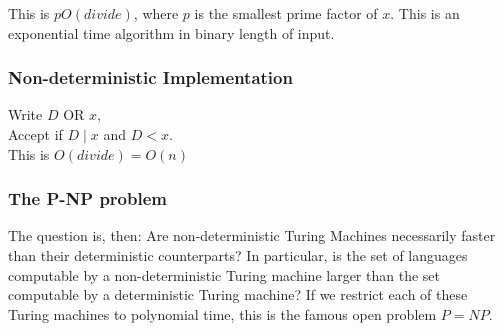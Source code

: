 This is $pO(divide)$, where $p$ is the smallest prime factor of $x$.
This is an exponential time algorithm in binary length of input.

\subsubsection*{Non-deterministic Implementation}
Write $D$ OR $x$, \\
\qquad Accept if $D\mid x$ and $D < x$.\\

This is $O(divide) = O(n)$

\subsubsection{The P-NP problem}
The question is, then: Are non-deterministic Turing Machines necessarily
faster than their deterministic counterparts? 
In particular, is the set of languages computable by a non-deterministic Turing machine 
larger than the set computable by a deterministic Turing machine? If we
restrict each of these Turing machines to polynomial time, this is the famous
open problem $P = NP$.
